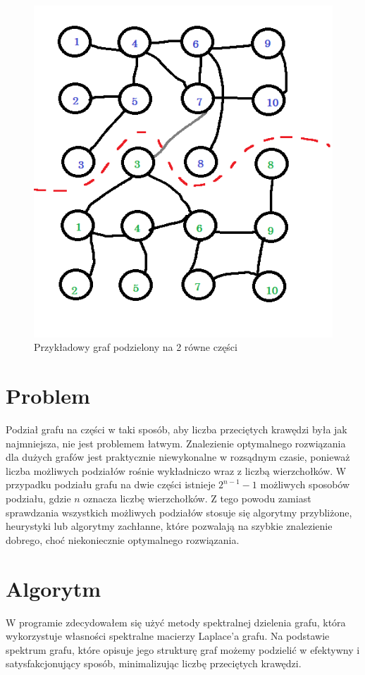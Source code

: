 \documentclass{article}
\begin{document}
    \begin{figure}[H]
        \centering
        \includegraphics[width=0.75\linewidth]{img/graph.png}
        \caption{Przykładowy graf podzielony na 2 równe części}
        \label{fig:graph}
    \end{figure}



\section{Problem}

    Podział grafu na części w taki sposób, aby liczba przeciętych krawędzi była jak najmniejsza, nie jest problemem łatwym. Znalezienie optymalnego rozwiązania dla dużych grafów jest praktycznie niewykonalne w rozsądnym czasie, ponieważ liczba możliwych podziałów rośnie wykładniczo wraz z liczbą wierzchołków.
    W przypadku podziału grafu na dwie części istnieje \( 2^{n-1} - 1 \) możliwych sposobów podziału, gdzie \( n \) oznacza liczbę wierzchołków. Z tego powodu zamiast sprawdzania wszystkich możliwych podziałów stosuje się algorytmy przybliżone, heurystyki lub algorytmy zachłanne, które pozwalają na szybkie znalezienie dobrego, choć niekoniecznie optymalnego rozwiązania.

\section{Algorytm}

W programie zdecydowałem się użyć metody spektralnej dzielenia grafu, która wykorzystuje własności spektralne macierzy Laplace'a grafu. Na podstawie spektrum grafu, które opisuje jego strukturę graf możemy podzielić w efektywny i satysfakcjonujący sposób, minimalizując liczbę przeciętych krawędzi.
\end{document}

